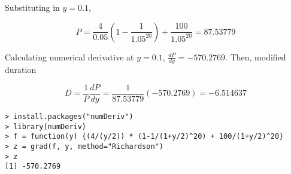 \documentclass[11pt]{scrartcl}
\begin{document}
Substituting in $y = 0.1$, 

\[P = \frac{4}{0.05} \left( 1 - \frac{1}{1.05^{20}}\right) + \frac{100}{1.05^{20}} = 87.53779\]

Calculating numerical derivative at $y = 0.1$, $\frac{d P}{d y} = -570.2769$. Then, modified duration

\[D = \frac{1}{P}\frac{dP}{dy} = \frac{1}{87.53779}(-570.2769) = -6.514637\]

\begin{lstlisting}
> install.packages("numDeriv")
> library(numDeriv)
> f = function(y) {(4/(y/2)) * (1-1/(1+y/2)^20) + 100/(1+y/2)^20}
> z = grad(f, y, method="Richardson")
> z
[1] -570.2769
\end{lstlisting}
\end{document}
